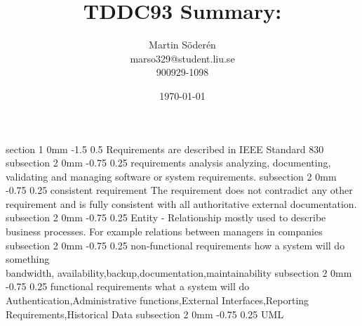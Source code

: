 \documentclass[a4paper,11pt]{article}
\makeatletter
\renewcommand{\section}{\@startsection
   {section}%
   {1}%
   {0mm}%
   {-1.5\baselineskip}%
   {0.5\baselineskip}%
   {\sffamily\bfseries\upshape\normalsize}}%
\renewcommand{\subsection}{\@startsection
   {subsection}%
   {2}%
   {0mm}%
   {-0.75\baselineskip}%
   {0.25\baselineskip}%
   {\rmfamily\normalfont\slshape\normalsize}}%
\makeatother
\begin{document}
\begin{titlepage}
\title{TDDC93 Summary:}
\author{Martin Söderén\\ marso329@student.liu.se\\900929-1098}
\date{\today}
\maketitle
\vfill %
\thispagestyle{empty}
\end{titlepage}

\section{Requirements}
are described in IEEE Standard 830 
\subsection{requirements analysis}
analyzing, documenting, validating and managing software or system requirements.
\subsection{consistent requirement}
The requirement does not contradict any other requirement and is fully consistent with all authoritative external documentation.
\subsection{Entity - Relationship}
mostly used to describe business processes. For example relations between managers in companies
\subsection{non-functional requirements}
 how a system will do something
\\bandwidth, availability,backup,documentation,maintainability
\subsection{functional requirements}
what a system will do
\\Authentication,Administrative functions,External Interfaces,Reporting Requirements,Historical Data
\subsection{UML}

\\
\begingroup
{}%
%
\endgroup
\end{document}
